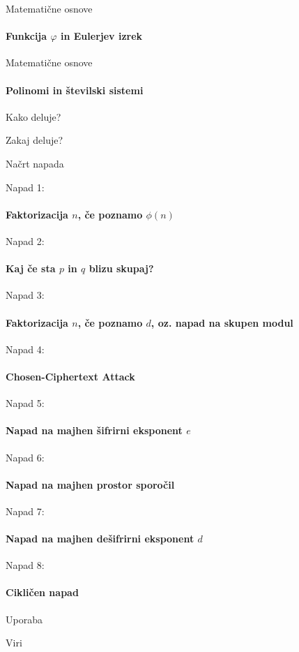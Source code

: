 \documentclass[a4paper, 12pt]{beamer} %
\begin{document}
\begin{frame}{Matematične osnove}
\framesubtitle{Funkcija $\varphi$ in Eulerjev izrek}
\end{frame}

\begin{frame}{Matematične osnove}
\framesubtitle{Polinomi in številski sistemi}
\end{frame}

\begin{frame}{Kako deluje?}
\end{frame}

\begin{frame}{Zakaj deluje?}
\end{frame}

\begin{frame}{Načrt napada}
\end{frame}

\begin{frame}{Napad 1:}
\framesubtitle{Faktorizacija $n$, če poznamo $\phi(n)$}
\end{frame}

\begin{frame}{Napad 2:}
\framesubtitle{Kaj če sta $p$ in $q$ blizu skupaj?}
\end{frame}

\begin{frame}{Napad 3:}
\framesubtitle{Faktorizacija $n$, če poznamo $d$, oz. napad na skupen modul}
\end{frame}

\begin{frame}{Napad 4:}
\framesubtitle{Chosen-Ciphertext Attack}
\end{frame}

\begin{frame}{Napad 5:}
 \framesubtitle{Napad na majhen šifrirni eksponent $e$}
\end{frame}

\begin{frame}{Napad 6:}
\framesubtitle{Napad na majhen prostor sporočil}
\end{frame}

\begin{frame}{Napad 7:}
\framesubtitle{Napad na majhen dešifrirni eksponent $d$}
\end{frame}

\begin{frame}{Napad 8:}
\framesubtitle{Cikličen napad}
\end{frame}

\begin{frame}{Uporaba}
\end{frame}

\begin{frame}{Viri}
\end{frame}
\end{document}
